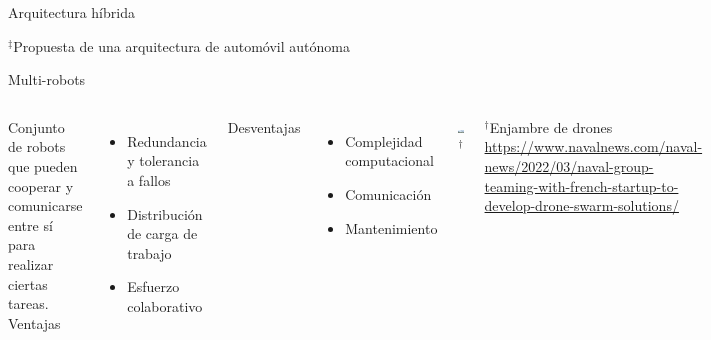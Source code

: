 \documentclass[
  24pt, %
  aspectratio=169, %
]{beamer}
\begin{document}
\begin{frame}{Arquitectura híbrida}
\begin{minipage}{0.4\textwidth}
    \rule{0in}{1.2em}$^\ddagger$\scriptsize Propuesta de una arquitectura de automóvil autónoma \cite{CurielRamirez2019}\\
  \end{minipage}
\end{frame}

\begin{frame}{Multi-robots}
  \begin{columns}
    \scriptsize Conjunto de robots que pueden cooperar y comunicarse entre sí para realizar ciertas tareas.\\
    \bigskip %
    \scriptsize Ventajas
    \begin{itemize}
      \scriptsize \item Redundancia y tolerancia a fallos
      \scriptsize \item Distribución de carga de trabajo
      \scriptsize \item Esfuerzo colaborativo
    \end{itemize}
    \bigskip %
    Desventajas
    \begin{itemize}
    \item Complejidad computacional
    \item Comunicación
    \item Mantenimiento
    \end{itemize}
    \includegraphics[width=\textwidth]{drone_swarm}$^\dag$\\
    \rule{0in}{1.2em}$^\dag$\scriptsize Enjambre de drones\\ \url{https://www.navalnews.com/naval-news/2022/03/naval-group-teaming-with-french-startup-to-develop-drone-swarm-solutions/}
  \end{columns}
\end{frame}
\end{document}
